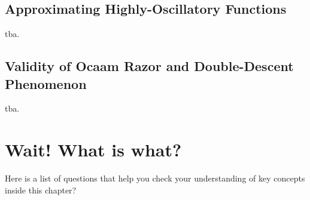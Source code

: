 \subsection{Approximating Highly-Oscillatory Functions}
\begin{boxedexample}[Classification] \complementary{\theexample}
    \label{ex:oscillatory}
    tba.
\end{boxedexample}

\subsection{Validity of Ocaam Razor and Double-Descent Phenomenon}
\begin{boxedexample} \complementary{\theexample}
    \label{ex:double_descent}
    tba.
\end{boxedexample}

\section*{Wait! What is what?}
Here is a list of questions that help you check your understanding of key
concepts inside this chapter?

